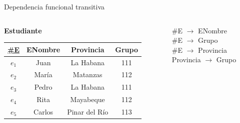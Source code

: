 \begin{frame}{Dependencia funcional transitiva}

    \begin{columns}[T]
        \begin{column}{0.5\linewidth}
            \begin{center}
                \textbf{Estudiante}\\[2mm]

                \begin{tabular}{cccc}
                    \underline{\#E} & ENombre & Provincia & Grupo\\[1mm]
                    \hline
                    $e_1$ & Juan & La Habana & 111\\
                    $e_2$ & Mar\'ia & Matanzas & 112\\
                    $e_3$ & Pedro & La Habana & 111\\
                    $e_4$ & Rita & Mayabeque & 112\\
                    $e_5$ & Carlos & Pinar del R\'io & 113\\
                \end{tabular}
            \end{center}
            
        \end{column}

        \begin{column}{0.5\linewidth}
            \vspace{15mm}
            \hspace{5mm} \#E $\to$ ENombre\\
            \hspace{5mm} \#E $\to$ Grupo\\
            \hspace{5mm} \#E $\to$ Provincia\\
            \hspace{5mm} Provincia $\to$ Grupo
        \end{column}
        
        
    \end{columns}
    \vspace{5mm}

    \centering
\end{frame}

